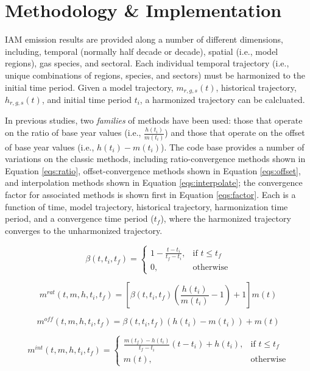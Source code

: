 
\section{Methodology \& Implementation}

IAM emission results are provided along a number of different dimensions,
including, temporal (normally half decade or decade), spatial (i.e., model
regions), gas species, and sectoral. Each individual temporal trajectory (i.e.,
unique combinations of regions, species, and sectors) must be harmonized to the
initial time period. Given a model trajectory, $m_{r, g, s}(t)$, historical
trajectory, $h_{r, g, s}(t)$, and initial time period $t_i$, a harmonized
trajectory can be calcluated.

In previous studies, two \textit{families} of methods have been used: those that
operate on the ratio of base year values (i.e., $\frac{h(t_i)}{m(t_i)}$) and
those that operate on the offset of base year values (i.e., $h(t_i) -
m(t_i)$). The  code base provides a number of variations on the
classic methods, including ratio-convergence methods shown in Equation
\ref{eqs:ratio}, offset-convergence methods shown in Equation \ref{eqs:offset},
and interpolation methods shown in Equation \ref{eqs:interpolate}; the
convergence factor for associated methods is shown first in Equation
\ref{eqs:factor}. Each is a function of time, model trajectory, historical
trajectory, harmonization time period, and a convergence time period ($t_f$),
where the harmonized trajectory converges to the unharmonized trajectory.

\begin{equation}\label{eqs:factor}
  \beta(t, t_i, t_f) =
  \begin{cases}
    1 - \frac{t - t_i}{t_f - t_i},& \text{if } t \leq t_f\\
    0,                        & \text{otherwise}
  \end{cases}
\end{equation}

\begin{equation}\label{eqs:ratio}
  m^{rat}(t, m, h, t_i, t_f) = [\beta(t, t_i, t_f) (\frac{h(t_i)}{m(t_i)} - 1) + 1] m(t)
\end{equation}

\begin{equation}\label{eqs:offset}
  m^{off}(t, m, h, t_i, t_f) = \beta(t, t_i, t_f) (h(t_i) - m(t_i)) + m(t)
\end{equation}
  
\begin{equation}\label{eqs:interpolate}
  m^{int}(t, m, h, t_i, t_f) =
  \begin{cases}
    \frac{m(t_f) - h(t_i)}{t_f - t_i}(t - t_i) + h(t_i), & \text{if } t \leq t_f\\
    m(t), & \text{otherwise}
  \end{cases}
\end{equation}

